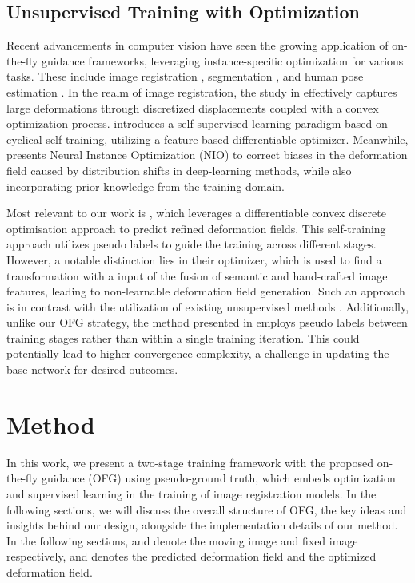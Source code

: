 \documentclass[10pt,twocolumn,letterpaper]{article}
\begin{document}
\subsection{Unsupervised Training with Optimization}

Recent advancements in computer vision have seen the growing application of on-the-fly guidance frameworks, leveraging instance-specific optimization for various tasks. These include image registration \cite{uns2023MICCAI,Def2024Spr}, segmentation \cite{ins2022arx}, and human pose estimation \cite{SPIN}. In the realm of image registration, the study in \cite{fas2022Spr} effectively captures large deformations through discretized displacements coupled with a convex optimization process. \cite{uns2023MICCAI} introduces a self-supervised learning paradigm based on cyclical self-training, utilizing a feature-based differentiable optimizer. Meanwhile, \cite{Def2024Spr} presents Neural Instance Optimization (NIO) to correct biases in the deformation field caused by distribution shifts in deep-learning methods, while also incorporating prior knowledge from the training domain.

Most relevant to our work is \cite{uns2023MICCAI}, which leverages a differentiable convex discrete optimisation approach \cite{lea2022SPR} to predict refined deformation fields. This self-training approach utilizes pseudo labels to guide the training across different stages. However, a notable distinction lies in their optimizer, which is used to find a transformation with a input of the fusion of semantic and hand-crafted image features, leading to non-learnable deformation field generation. Such an approach is in contrast with the utilization of existing unsupervised methods \cite{Balakrishnan_2019,chen2021vitvnet,Chen_2022}. Additionally, unlike our OFG strategy, the method presented in \cite{uns2023MICCAI} employs pseudo labels between training stages rather than within a single training iteration. This could potentially lead to higher convergence complexity, a challenge in updating the base network for desired outcomes.
 \section{Method}\label{sec:method}

In this work, we present a two-stage training framework with the proposed on-the-fly guidance (OFG) using pseudo-ground truth, which embeds optimization and supervised learning in the training of image registration models. In the following sections, we will discuss the overall structure of OFG, the key ideas and insights behind our design, alongside the implementation details of our method. In the following sections,  and  denote the moving image and fixed image respectively,  and  denotes the predicted deformation field and the optimized deformation field.
\end{document}
